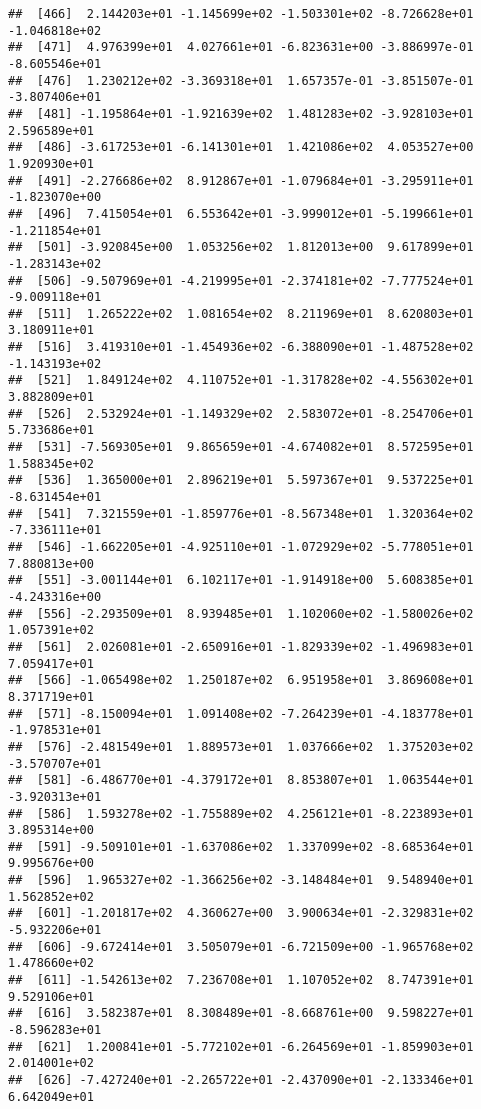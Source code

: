 \documentclass[]{book}
\begin{document}
\begin{verbatim}
##  [466]  2.144203e+01 -1.145699e+02 -1.503301e+02 -8.726628e+01 -1.046818e+02
##  [471]  4.976399e+01  4.027661e+01 -6.823631e+00 -3.886997e-01 -8.605546e+01
##  [476]  1.230212e+02 -3.369318e+01  1.657357e-01 -3.851507e-01 -3.807406e+01
##  [481] -1.195864e+01 -1.921639e+02  1.481283e+02 -3.928103e+01  2.596589e+01
##  [486] -3.617253e+01 -6.141301e+01  1.421086e+02  4.053527e+00  1.920930e+01
##  [491] -2.276686e+02  8.912867e+01 -1.079684e+01 -3.295911e+01 -1.823070e+00
##  [496]  7.415054e+01  6.553642e+01 -3.999012e+01 -5.199661e+01 -1.211854e+01
##  [501] -3.920845e+00  1.053256e+02  1.812013e+00  9.617899e+01 -1.283143e+02
##  [506] -9.507969e+01 -4.219995e+01 -2.374181e+02 -7.777524e+01 -9.009118e+01
##  [511]  1.265222e+02  1.081654e+02  8.211969e+01  8.620803e+01  3.180911e+01
##  [516]  3.419310e+01 -1.454936e+02 -6.388090e+01 -1.487528e+02 -1.143193e+02
##  [521]  1.849124e+02  4.110752e+01 -1.317828e+02 -4.556302e+01  3.882809e+01
##  [526]  2.532924e+01 -1.149329e+02  2.583072e+01 -8.254706e+01  5.733686e+01
##  [531] -7.569305e+01  9.865659e+01 -4.674082e+01  8.572595e+01  1.588345e+02
##  [536]  1.365000e+01  2.896219e+01  5.597367e+01  9.537225e+01 -8.631454e+01
##  [541]  7.321559e+01 -1.859776e+01 -8.567348e+01  1.320364e+02 -7.336111e+01
##  [546] -1.662205e+01 -4.925110e+01 -1.072929e+02 -5.778051e+01  7.880813e+00
##  [551] -3.001144e+01  6.102117e+01 -1.914918e+00  5.608385e+01 -4.243316e+00
##  [556] -2.293509e+01  8.939485e+01  1.102060e+02 -1.580026e+02  1.057391e+02
##  [561]  2.026081e+01 -2.650916e+01 -1.829339e+02 -1.496983e+01  7.059417e+01
##  [566] -1.065498e+02  1.250187e+02  6.951958e+01  3.869608e+01  8.371719e+01
##  [571] -8.150094e+01  1.091408e+02 -7.264239e+01 -4.183778e+01 -1.978531e+01
##  [576] -2.481549e+01  1.889573e+01  1.037666e+02  1.375203e+02 -3.570707e+01
##  [581] -6.486770e+01 -4.379172e+01  8.853807e+01  1.063544e+01 -3.920313e+01
##  [586]  1.593278e+02 -1.755889e+02  4.256121e+01 -8.223893e+01  3.895314e+00
##  [591] -9.509101e+01 -1.637086e+02  1.337099e+02 -8.685364e+01  9.995676e+00
##  [596]  1.965327e+02 -1.366256e+02 -3.148484e+01  9.548940e+01  1.562852e+02
##  [601] -1.201817e+02  4.360627e+00  3.900634e+01 -2.329831e+02 -5.932206e+01
##  [606] -9.672414e+01  3.505079e+01 -6.721509e+00 -1.965768e+02  1.478660e+02
##  [611] -1.542613e+02  7.236708e+01  1.107052e+02  8.747391e+01  9.529106e+01
##  [616]  3.582387e+01  8.308489e+01 -8.668761e+00  9.598227e+01 -8.596283e+01
##  [621]  1.200841e+01 -5.772102e+01 -6.264569e+01 -1.859903e+01  2.014001e+02
##  [626] -7.427240e+01 -2.265722e+01 -2.437090e+01 -2.133346e+01  6.642049e+01

\end{verbatim}
\end{document}

